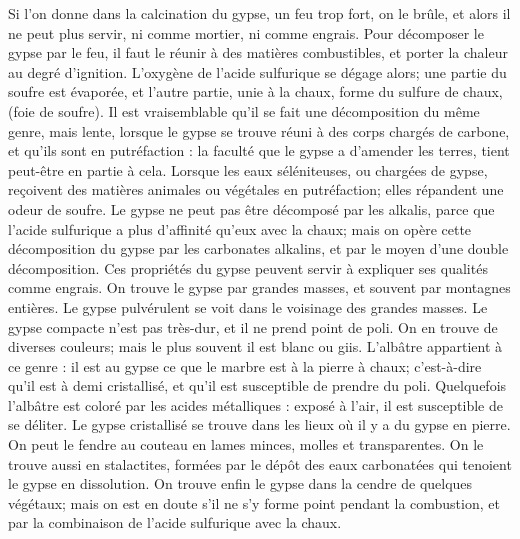 Si l'on donne dans la calcination du gypse, un feu trop fort, on le brûle, et alors il ne peut plus servir, ni comme mortier, ni comme engrais. Pour décomposer le gypse par le feu, il faut le réunir à des matières combustibles, et porter la chaleur au degré d'ignition. L'oxygène de l'acide sulfurique se dégage alors; une partie du soufre est évaporée, et l'autre partie, unie à la chaux, forme du sulfure de chaux, (foie de soufre).
Il est vraisemblable qu'il se fait une décomposition du même genre, mais lente, lorsque le gypse se trouve réuni à des corps chargés de carbone, et qu'ils sont en putréfaction : la faculté que le gypse a d'amender les terres, tient peut-être en partie à cela. Lorsque les eaux séléniteuses, ou chargées de gypse, reçoivent des matières animales ou végétales en putréfaction; elles répandent une odeur de soufre.\setcounter{page}{44} Le gypse ne peut pas être décomposé par les alkalis, parce que l'acide sulfurique a plus d'affinité qu'eux avec la chaux; mais on opère cette décomposition du gypse par les carbonates alkalins, et par le moyen d'une double décomposition. Ces propriétés du gypse peuvent servir à expliquer ses qualités comme engrais.
On trouve le gypse par grandes masses, et souvent par montagnes entières. Le gypse pulvérulent se voit dans le voisinage des grandes masses. Le gypse compacte n'est pas très-dur, et il ne prend point de poli. On en trouve de diverses couleurs; mais le plus souvent il est blanc ou giis. L'albâtre appartient à ce genre : il est au gypse ce que le marbre est à la pierre à chaux; c'est-à-dire qu'il est à demi cristallisé, et qu'il est susceptible de prendre du poli. Quelquefois l'albâtre est coloré par les acides métalliques : exposé à l'air, il est susceptible de se déliter.
Le gypse cristallisé se trouve dans les lieux où il y a du gypse en pierre. On peut le fendre au couteau en lames minces, molles et transparentes.
On le trouve aussi en stalactites, formées par le dépôt des eaux carbonatées qui tenoient le gypse en dissolution. On trouve enfin le gypse dans la cendre de quelques végétaux;\setcounter{page}{45} mais on est en doute s'il ne s'y forme point pendant la combustion, et par la combinaison de l'acide sulfurique avec la chaux.
